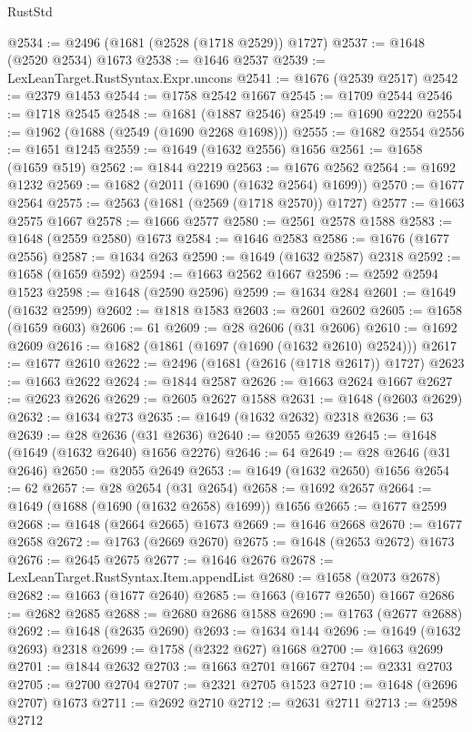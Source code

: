 \begin{lexlean}{RustStd}
\begin{coremodule}
{\begin{coremodule}
{{{{{{{{{{{{{{{{{{{{{{{{{{{{{{{{{{{{{{{{{{{{@2534 := @2496 (@1681 (@2528 (@1718 @2529)) @1727)
@2537 := @1648 (@2520 @2534) @1673
@2538 := @1646 @2537
@2539 := LexLeanTarget.RustSyntax.Expr.uncons
@2541 := @1676 (@2539 @2517)
@2542 := @2379 @1453
@2544 := @1758 @2542 @1667
@2545 := @1709 @2544
@2546 := @1718 @2545
@2548 := @1681 (@1887 @2546)
@2549 := @1690 @2220
@2554 := @1962 (@1688 (@2549 (@1690 @2268 @1698)))
@2555 := @1682 @2554
@2556 := @1651 @1245
@2559 := @1649 (@1632 @2556) @1656
@2561 := @1658 (@1659 @519)
@2562 := @1844 @2219
@2563 := @1676 @2562
@2564 := @1692 @1232
@2569 := @1682 (@2011 (@1690 (@1632 @2564) @1699))
@2570 := @1677 @2564
@2575 := @2563 (@1681 (@2569 (@1718 @2570)) @1727)
@2577 := @1663 @2575 @1667
@2578 := @1666 @2577
@2580 := @2561 @2578 @1588
@2583 := @1648 (@2559 @2580) @1673
@2584 := @1646 @2583
@2586 := @1676 (@1677 @2556)
@2587 := @1634 @263
@2590 := @1649 (@1632 @2587) @2318
@2592 := @1658 (@1659 @592)
@2594 := @1663 @2562 @1667
@2596 := @2592 @2594 @1523
@2598 := @1648 (@2590 @2596)
@2599 := @1634 @284
@2601 := @1649 (@1632 @2599)
@2602 := @1818 @1583
@2603 := @2601 @2602
@2605 := @1658 (@1659 @603)
@2606 := 61
@2609 := @28 @2606 (@31 @2606)
@2610 := @1692 @2609
@2616 := @1682 (@1861 (@1697 (@1690 (@1632 @2610) @2524)))
@2617 := @1677 @2610
@2622 := @2496 (@1681 (@2616 (@1718 @2617)) @1727)
@2623 := @1663 @2622
@2624 := @1844 @2587
@2626 := @1663 @2624 @1667
@2627 := @2623 @2626
@2629 := @2605 @2627 @1588
@2631 := @1648 (@2603 @2629)
@2632 := @1634 @273
@2635 := @1649 (@1632 @2632) @2318
@2636 := 63
@2639 := @28 @2636 (@31 @2636)
@2640 := @2055 @2639
@2645 := @1648 (@1649 (@1632 @2640) @1656 @2276)
@2646 := 64
@2649 := @28 @2646 (@31 @2646)
@2650 := @2055 @2649
@2653 := @1649 (@1632 @2650) @1656
@2654 := 62
@2657 := @28 @2654 (@31 @2654)
@2658 := @1692 @2657
@2664 := @1649 (@1688 (@1690 (@1632 @2658) @1699)) @1656
@2665 := @1677 @2599
@2668 := @1648 (@2664 @2665) @1673
@2669 := @1646 @2668
@2670 := @1677 @2658
@2672 := @1763 (@2669 @2670)
@2675 := @1648 (@2653 @2672) @1673
@2676 := @2645 @2675
@2677 := @1646 @2676
@2678 := LexLeanTarget.RustSyntax.Item.appendList
@2680 := @1658 (@2073 @2678)
@2682 := @1663 (@1677 @2640)
@2685 := @1663 (@1677 @2650) @1667
@2686 := @2682 @2685
@2688 := @2680 @2686 @1588
@2690 := @1763 (@2677 @2688)
@2692 := @1648 (@2635 @2690)
@2693 := @1634 @144
@2696 := @1649 (@1632 @2693) @2318
@2699 := @1758 (@2322 @627) @1668
@2700 := @1663 @2699
@2701 := @1844 @2632
@2703 := @1663 @2701 @1667
@2704 := @2331 @2703
@2705 := @2700 @2704
@2707 := @2321 @2705 @1523
@2710 := @1648 (@2696 @2707) @1673
@2711 := @2692 @2710
@2712 := @2631 @2711
@2713 := @2598 @2712
}}}}}}}}}}}}}}}}}}}}}}}}}}}}}}}}}}}}}}}}}}}}
\end{coremodule}}
\end{coremodule}
\end{lexlean}
